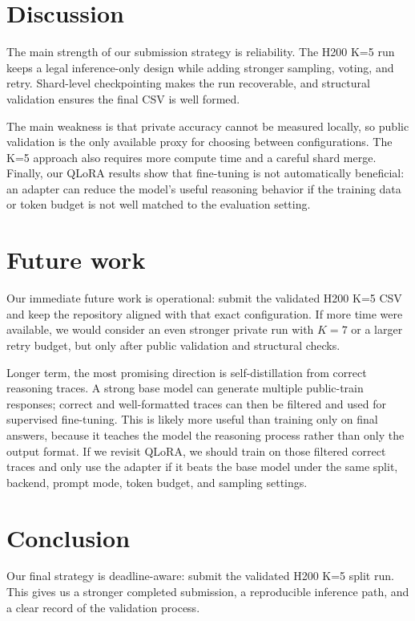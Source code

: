 \documentclass{article}
\begin{document}
\section{Discussion}

The main strength of our submission strategy is reliability. The H200 K=5 run keeps a legal inference-only design while adding stronger sampling, voting, and retry. Shard-level checkpointing makes the run recoverable, and structural validation ensures the final CSV is well formed.

The main weakness is that private accuracy cannot be measured locally, so public validation is the only available proxy for choosing between configurations. The K=5 approach also requires more compute time and a careful shard merge. Finally, our QLoRA results show that fine-tuning is not automatically beneficial: an adapter can reduce the model's useful reasoning behavior if the training data or token budget is not well matched to the evaluation setting.

\section{Future work}

Our immediate future work is operational: submit the validated H200 K=5 CSV and keep the repository aligned with that exact configuration. If more time were available, we would consider an even stronger private run with $K=7$ or a larger retry budget, but only after public validation and structural checks.

Longer term, the most promising direction is self-distillation from correct reasoning traces. A strong base model can generate multiple public-train responses; correct and well-formatted traces can then be filtered and used for supervised fine-tuning. This is likely more useful than training only on final answers, because it teaches the model the reasoning process rather than only the output format. If we revisit QLoRA, we should train on those filtered correct traces and only use the adapter if it beats the base model under the same split, backend, prompt mode, token budget, and sampling settings.

\section{Conclusion}

Our final strategy is deadline-aware: submit the validated H200 K=5 split run. This gives us a stronger completed submission, a reproducible inference path, and a clear record of the validation process.
\end{document}
